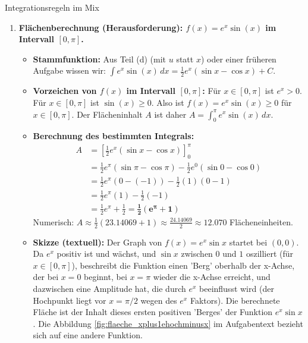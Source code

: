 \begin{loesungsumgebung}{Integrationsregeln im Mix}
\begin{enumerate}[label=(\alph*)]
    \item \textbf{Flächenberechnung (Herausforderung): $f(x) = e^x \sin(x)$ im Intervall $[0, \pi]$.}
    \begin{itemize}
        \item \textbf{Stammfunktion:} Aus Teil (d) (mit $u$ statt $x$) oder einer früheren Aufgabe wissen wir: $\int e^x \sin(x) \,dx = \frac{1}{2}e^x(\sin x - \cos x) + C$.
        \item \textbf{Vorzeichen von $f(x)$ im Intervall $[0, \pi]$:}
        Für $x \in [0, \pi]$ ist $e^x > 0$.
        Für $x \in [0, \pi]$ ist $\sin(x) \ge 0$.
        Also ist $f(x) = e^x \sin(x) \ge 0$ für $x \in [0, \pi]$.
        Der Flächeninhalt $A$ ist daher $A = \int_0^\pi e^x \sin(x) \,dx$.
        \item \textbf{Berechnung des bestimmten Integrals:}
        \begin{align*} A &= \left[ \frac{1}{2}e^x(\sin x - \cos x) \right]_0^\pi \\ &= \frac{1}{2}e^\pi(\sin\pi - \cos\pi) - \frac{1}{2}e^0(\sin 0 - \cos 0) \\ &= \frac{1}{2}e^\pi(0 - (-1)) - \frac{1}{2}(1)(0 - 1) \\ &= \frac{1}{2}e^\pi(1) - \frac{1}{2}(-1) \\ &= \frac{1}{2}e^\pi + \frac{1}{2} = \mathbf{\frac{1}{2}(e^\pi + 1)} \end{align*}
        Numerisch: $A \approx \frac{1}{2}(23.14069 + 1) \approx \frac{24.14069}{2} \approx 12.070$ Flächeneinheiten.
        \item \textbf{Skizze (textuell):} Der Graph von $f(x)=e^x\sin x$ startet bei $(0,0)$. Da $e^x$ positiv ist und wächst, und $\sin x$ zwischen $0$ und $1$ oszilliert (für $x \in [0,\pi]$), beschreibt die Funktion einen 'Berg' oberhalb der x-Achse, der bei $x=0$ beginnt, bei $x=\pi$ wieder die x-Achse erreicht, und dazwischen eine Amplitude hat, die durch $e^x$ beeinflusst wird (der Hochpunkt liegt vor $x=\pi/2$ wegen des $e^x$ Faktors). Die berechnete Fläche ist der Inhalt dieses ersten positiven 'Berges' der Funktion $e^x \sin x$. Die Abbildung \ref{fig:flaeche_xplus1ehochminusx} im Aufgabentext bezieht sich auf eine andere Funktion.
    \end{itemize}
\end{enumerate}

\end{loesungsumgebung}




